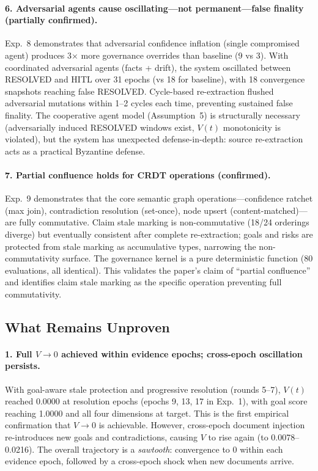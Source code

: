 \documentclass[11pt]{article}
\begin{document}
\paragraph{6. Adversarial agents cause oscillating---not permanent---false finality (partially confirmed).} Exp.~8 demonstrates that adversarial confidence inflation (single compromised agent) produces 3$\times$ more governance overrides than baseline (9 vs 3). With coordinated adversarial agents (facts + drift), the system oscillated between RESOLVED and HITL over 31 epochs (vs 18 for baseline), with 18 convergence snapshots reaching false RESOLVED. Cycle-based re-extraction flushed adversarial mutations within 1--2 cycles each time, preventing sustained false finality. The cooperative agent model (Assumption~5) is structurally necessary (adversarially induced RESOLVED windows exist, $V(t)$ monotonicity is violated), but the system has unexpected defense-in-depth: source re-extraction acts as a practical Byzantine defense.

\paragraph{7. Partial confluence holds for CRDT operations (confirmed).} Exp.~9 demonstrates that the core semantic graph operations---confidence ratchet (max join), contradiction resolution (set-once), node upsert (content-matched)---are fully commutative. Claim stale marking is non-commutative (18/24 orderings diverge) but eventually consistent after complete re-extraction; goals and risks are protected from stale marking as accumulative types, narrowing the non-commutativity surface. The governance kernel is a pure deterministic function (80 evaluations, all identical). This validates the paper's claim of ``partial confluence'' and identifies claim stale marking as the specific operation preventing full commutativity.

\subsection{What Remains Unproven}

\paragraph{1. Full $V \to 0$ achieved within evidence epochs; cross-epoch oscillation persists.} With goal-aware stale protection and progressive resolution (rounds 5--7), $V(t)$ reached 0.0000 at resolution epochs (epochs 9, 13, 17 in Exp.~1), with goal score reaching 1.0000 and all four dimensions at target. This is the first empirical confirmation that $V \to 0$ is achievable. However, cross-epoch document injection re-introduces new goals and contradictions, causing $V$ to rise again (to 0.0078--0.0216). The overall trajectory is a \emph{sawtooth}: convergence to 0 within each evidence epoch, followed by a cross-epoch shock when new documents arrive.
\end{document}
